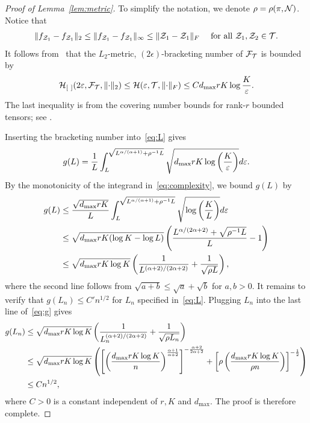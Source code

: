 \documentclass[11pt]{article}
\theoremstyle{plain}
\theoremstyle{definition}
\begin{document}
\begin{proof}[Proof of Lemma~\ref{lem:metric}]
To simplify the notation, we denote $\rho=\rho(\pi, \mathcal{N})$. 
Notice that 
\begin{align}
	\lVert f_{\mathcal{Z}_1}-f_{\mathcal{Z}_1}\rVert_2\leq\|f_{\mathcal{Z}_1}-f_{\mathcal{Z}_1}\|_\infty\leq \lVert\mathcal{Z}_1-\mathcal{Z}_1\rVert_F\quad\text{ for all } \mathcal{Z}_1,\mathcal{Z}_2\in\mathcal{T}.
\end{align}
It follows from~\citet[Theorem 9.22]{kosorok2007introduction} that the $L_2$-metric, $(2\epsilon)$-bracketing number of $\mathcal{F}_{\mathcal{T}}$ is bounded by 
\[
\mathcal{H}_{[\ ]}(2\varepsilon, \mathcal{F}_{\mathcal{T}}, \lVert\cdot\rVert_2)\leq \mathcal{H}(\varepsilon, \mathcal{T}, \lVert\cdot\rVert_F) \leq Cd_{\max}rK\log {K\over \varepsilon}.
\]
The last inequality is from the covering number bounds for rank-$r$ bounded tensors; see \citet[Lemma 3]{mu2014square}.

Inserting the bracketing number into~\eqref{eq:L} gives
\begin{equation}\label{eq:complexity}
g(L)={1\over L}\int^{\sqrt{L^{\alpha/(\alpha+1)}+{\rho^{-1}L}}}_{L}  \sqrt{d_{\max}rK\log\left({K\over \varepsilon}\right)}d\varepsilon.
\end{equation}
By the monotonicity of the integrand in~\eqref{eq:complexity}, we bound $g(L)$ by 
\begin{align}\label{eq:g}
g(L)&\leq {\sqrt{d_{\max}rK}\over L}\int_{L}^{\sqrt{L^{\alpha/(\alpha+1)}+\rho^{-1}L}}\sqrt{\log \left(K \over L \right)}d\varepsilon\notag \\
&\leq \sqrt{d_{\max}rK(\log K - \log L)}\left({L^{\alpha/(2\alpha+2)}+\sqrt{\rho^{-1}L} \over L }-1\right)\notag \\
&\leq  \sqrt{d_{\max}rK\log K}\left( {1\over L^{(\alpha+2)/(2\alpha+2)}}+{1\over \sqrt{\rho L}}\right),
\end{align}
where the second line follows from $\sqrt{a+b} \leq \sqrt{a}+\sqrt{b}$ for $a,b>0$.
It remains to verify that $g(L_n) \leq C'n^{1/2}$ for $L_n$ specified in~\eqref{eq:L}. Plugging $L_n$ into the last line of~\eqref{eq:g} gives
\begin{align}
g(L_n)&\leq \sqrt{d_{\max}rK\log K}\left( {1\over L_n^{(\alpha+2)/(2\alpha+2)}}+{1\over \sqrt{\rho L_n}}\right)
\\&\leq \sqrt{d_{\max}rK\log K}\left(\left[\left(d_{\max}rK\log K\over n\right)^{\alpha+1\over \alpha+2}\right]^{-{\alpha+2\over2\alpha+2}}+\left[\rho \left(d_{\max}rK\log K\over \rho n\right)\right]^{-{1\over2}} \right)
\\&\leq Cn^{1/2},
\end{align}
where $C>0$ is a constant independent of $r,K$  and $d_{\text{max}}$. The proof is therefore complete.  
\end{proof}
\end{document}
